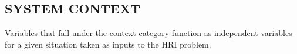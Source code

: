 \documentclass[letterpaper, 10 pt, conference]{ieeeconf}  %
\theoremstyle{definition}
\begin{document}
\subsection{SYSTEM CONTEXT}
Variables that fall under the context category function as independent variables for a given situation taken as inputs to the HRI problem. 

\end{document}
